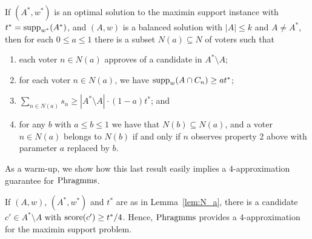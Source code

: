 \begin{lemma}\label{lem:N_a}
If $(A^*, w^*)$ is an optimal solution to the maximin support instance with $t^*=\operatorname{supp}_{w^*}(A^*)$, and $(A,w)$ is a balanced solution with $|A|\leq k$ and $A\neq A^*$, then for each $0\leq a\leq 1$ there is a subset $N(a)\subseteq N$ of voters such that 
\begin{enumerate}
	\item each voter $n\in N(a)$ approves of a candidate in $A^*\setminus A$;
	\item for each voter $n\in N(a)$, we have $\operatorname{supp}_w(A\cap C_n)\geq at^*$;
	\item $\sum_{n\in N(a)} s_n \geq |A^* \setminus A|\cdot (1-a) t^*$; and
	\item for any $b$ with $a\leq b\leq 1$ we have that $N(b)\subseteq N(a)$, and a voter $n\in N(a)$ belongs to $N(b)$ if and only if $n$ observes property 2 above with parameter $a$ replaced by $b$.
\end{enumerate}
\end{lemma}

As a warm-up, we show how this last result easily implies a $4$-approximation guarantee for $\operatorname{Phragmms}$.

\begin{lemma}
If $(A,w)$, $(A^*,w^*)$ and $t^*$ are as in Lemma~\ref{lem:N_a}, there is a candidate $c'\in A^*\setminus A$ with $\operatorname{score}(c')\geq t^*/4$. Hence, $\operatorname{Phragmms}$ provides a $4$-approximation for the maximin support problem.
\end{lemma}

